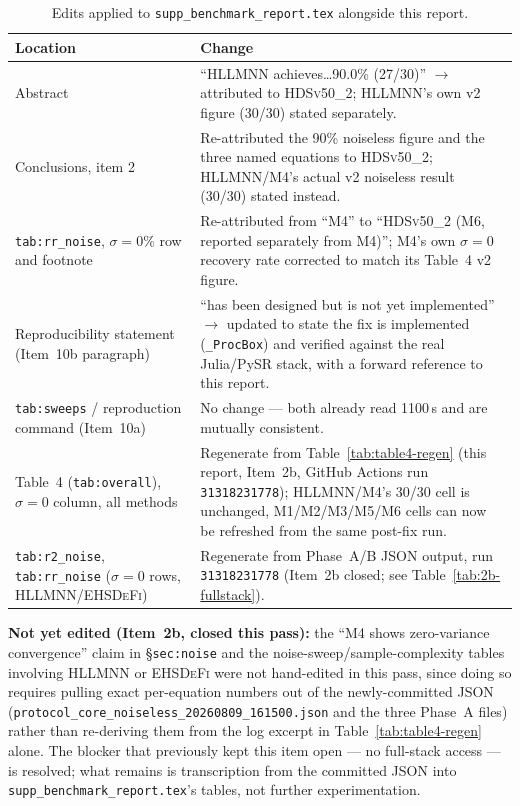 \documentclass[twoside,11pt]{article}
\newcommand{\EHD}{\textsc{EHSDeFi}}
\newcommand{\HSL}{\textsc{HLLMNN}}
\newcommand{\HDS}{\textsc{HDSv50\_2}}
\begin{document}
\begin{table}[h]
\centering
\caption{Edits applied to \texttt{supp\_benchmark\_report.tex} alongside
  this report.}
\label{tab:edits}
\small
\begin{tabular}{L{2.8cm} L{9.2cm}}
\toprule
\textbf{Location} & \textbf{Change} \\
\midrule
Abstract & ``\HSL{} achieves\ldots 90.0\% (27/30)'' $\rightarrow$
  attributed to \HDS; \HSL's own v2 figure (30/30) stated separately. \\
Conclusions, item 2 & Re-attributed the 90\% noiseless figure and the
  three named equations to \HDS; \HSL/M4's actual v2 noiseless result
  (30/30) stated instead. \\
\texttt{tab:rr\_noise}, $\sigma{=}0\%$ row and footnote & Re-attributed
  from ``M4'' to ``\HDS{} (M6, reported separately from M4)''; M4's own
  $\sigma=0$ recovery rate corrected to match its Table~4 v2 figure. \\
Reproducibility statement (Item~10b paragraph) & ``has been designed
  but is not yet implemented'' $\rightarrow$ updated to state the fix
  is implemented (\texttt{\_ProcBox}) and verified against the real
  Julia/PySR stack, with a forward reference to this report. \\
\texttt{tab:sweeps} / reproduction command (Item~10a) & No change ---
  both already read 1100\,s and are mutually consistent. \\
Table~4 (\texttt{tab:overall}), $\sigma=0$ column, all methods &
  Regenerate from Table~\ref{tab:table4-regen} (this report,
  Item~2b, GitHub Actions run \texttt{31318231778}); \HSL{}/M4's
  30/30 cell is unchanged, M1/M2/M3/M5/M6 cells can now be refreshed
  from the same post-fix run. \\
\texttt{tab:r2\_noise}, \texttt{tab:rr\_noise} ($\sigma=0$ rows,
  \HSL{}/\EHD{}) & Regenerate from Phase~A/B JSON output, run
  \texttt{31318231778} (Item~2b closed; see
  Table~\ref{tab:2b-fullstack}). \\
\bottomrule
\end{tabular}
\end{table}

\noindent \textbf{Not yet edited (Item~2b, closed this pass):} the
``M4 shows zero-variance convergence'' claim in \S\texttt{sec:noise}
and the noise-sweep/sample-complexity tables involving \HSL{} or \EHD{}
were not hand-edited in this pass, since doing so requires pulling
exact per-equation numbers out of the newly-committed JSON
(\texttt{protocol\_core\_noiseless\_20260809\_161500.json} and the
three Phase~A files) rather than re-deriving them from the log excerpt
in Table~\ref{tab:table4-regen} alone. The blocker that previously kept
this item open --- no full-stack access --- is resolved; what remains
is transcription from the committed JSON into
\texttt{supp\_benchmark\_report.tex}'s tables, not further
experimentation.
\end{document}
